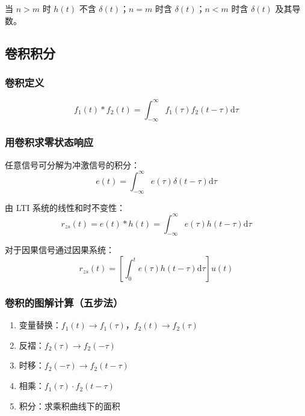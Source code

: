 \documentclass[11pt,a4paper]{ctexart}
\newcommand{\dd}{\mathrm{d}}            %
\newcommand{\dirac}{\delta}             %
\begin{document}
当 $n > m$ 时 $h(t)$ 不含 $\dirac(t)$；$n = m$ 时含 $\dirac(t)$；$n < m$ 时含 $\dirac(t)$ 及其导数。

\subsection{卷积积分}

\subsubsection{卷积定义}
\[
f_1(t) * f_2(t) = \int_{-\infty}^{\infty} f_1(\tau) f_2(t - \tau)\dd\tau
\]

\subsubsection{用卷积求零状态响应}
任意信号可分解为冲激信号的积分：
\[
e(t) = \int_{-\infty}^{\infty} e(\tau)\dirac(t - \tau)\dd\tau
\]

由 LTI 系统的线性和时不变性：
\[
\boxed{r_{zs}(t) = e(t) * h(t) = \int_{-\infty}^{\infty} e(\tau)h(t - \tau)\dd\tau}
\]

对于因果信号通过因果系统：
\[
r_{zs}(t) = \left[\int_{0}^{t} e(\tau)h(t - \tau)\dd\tau\right]u(t)
\]

\subsubsection{卷积的图解计算（五步法）}
\begin{enumerate}
    \item 变量替换：$f_1(t) \to f_1(\tau)$，$f_2(t) \to f_2(\tau)$
    \item 反褶：$f_2(\tau) \to f_2(-\tau)$
    \item 时移：$f_2(-\tau) \to f_2(t - \tau)$
    \item 相乘：$f_1(\tau) \cdot f_2(t - \tau)$
    \item 积分：求乘积曲线下的面积
\end{enumerate}
\end{document}
